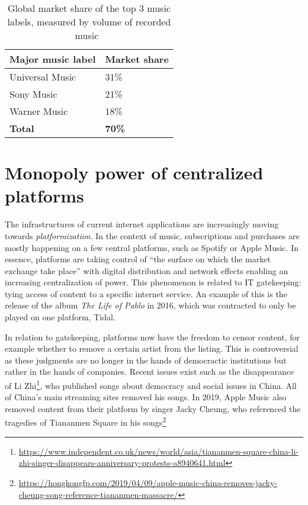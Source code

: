 \begin{table}[]
\begin{tabular}{|l|l|}
\hline
\textbf{Major music label} & \textbf{Market share} \\ \hline
Universal Music                    & 31\%                  \\ \hline
Sony Music                & 21\%                  \\ \hline
Warner Music               & 18\%                  \\ \hline
\textbf{Total}             & \textbf{70\%}         \\ \hline
\end{tabular}
\caption{Global market share of the top 3 music labels, measured by volume of recorded music~\citep{midiamarketshare2020}}
\label{tab:music-labels-market-share}
\end{table}

\section{Monopoly power of centralized platforms}
The infrastructures of current internet applications are increasingly moving towards \textit{platformization}. In the context of music, subscriptions and purchases are mostly happening on a few central platforms, such as Spotify or Apple Music. In essence, platforms are taking control of ``the surface on which the market exchange take place'' \citep{andersson2016mastering} with digital distribution and network effects enabling an increasing centralization of power. This phenomenon is related to IT gatekeeping: tying access of content to a specific internet service. An example of this is the release of the album \textit{The Life of Pablo} in 2016, which was contracted to only be played on one platform, Tidal. 

\label{sec:problem-description-censoring}
In relation to gatekeeping, platforms now have the freedom to censor content, for example whether to remove a certain artist from the listing. This is controversial as these judgments are no longer in the hands of democractic institutions but rather in the hands of companies. Recent issues exist such as the disappearance of Li Zhi\footnote{\url{https://www.independent.co.uk/news/world/asia/tiananmen-square-china-li-zhi-singer-disappears-anniversary-protests-a8940641.html}}, who published songs about democracy and social issues in China. All of China's main streaming sites removed his songs. In 2019, Apple Music also removed content from their platform by singer Jacky Cheung, who referenced the tragedies of Tiananmen Square in his songs\footnote{\url{https://hongkongfp.com/2019/04/09/apple-music-china-removes-jacky-cheung-song-reference-tiananmen-massacre/}}

